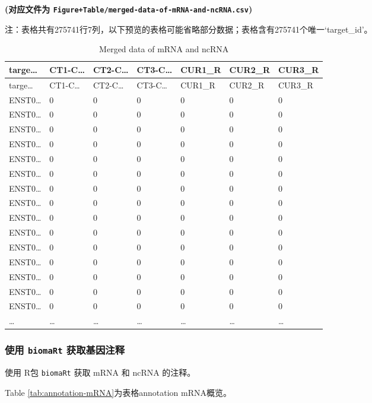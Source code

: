 \documentclass[
]{article}
\begin{document}
\textbf{(对应文件为 \texttt{Figure+Table/merged-data-of-mRNA-and-ncRNA.csv})}

\begin{center}\begin{tcolorbox}[colback=gray!10, colframe=gray!50, width=0.9\linewidth, arc=1mm, boxrule=0.5pt]注：表格共有275741行7列，以下预览的表格可能省略部分数据；表格含有275741个唯一`target\_id'。
\end{tcolorbox}
\end{center}

\begin{longtable}[]{@{}lllllll@{}}
\caption{\label{tab:merged-data-of-mRNA-and-ncRNA}Merged data of mRNA and ncRNA}\tabularnewline
\toprule
targe\ldots{} & CT1-C\ldots{} & CT2-C\ldots{} & CT3-C\ldots{} & CUR1\_R & CUR2\_R & CUR3\_R\tabularnewline
\midrule
\endfirsthead
\toprule
targe\ldots{} & CT1-C\ldots{} & CT2-C\ldots{} & CT3-C\ldots{} & CUR1\_R & CUR2\_R & CUR3\_R\tabularnewline
\midrule
\endhead
ENST0\ldots{} & 0 & 0 & 0 & 0 & 0 & 0\tabularnewline
ENST0\ldots{} & 0 & 0 & 0 & 0 & 0 & 0\tabularnewline
ENST0\ldots{} & 0 & 0 & 0 & 0 & 0 & 0\tabularnewline
ENST0\ldots{} & 0 & 0 & 0 & 0 & 0 & 0\tabularnewline
ENST0\ldots{} & 0 & 0 & 0 & 0 & 0 & 0\tabularnewline
ENST0\ldots{} & 0 & 0 & 0 & 0 & 0 & 0\tabularnewline
ENST0\ldots{} & 0 & 0 & 0 & 0 & 0 & 0\tabularnewline
ENST0\ldots{} & 0 & 0 & 0 & 0 & 0 & 0\tabularnewline
ENST0\ldots{} & 0 & 0 & 0 & 0 & 0 & 0\tabularnewline
ENST0\ldots{} & 0 & 0 & 0 & 0 & 0 & 0\tabularnewline
ENST0\ldots{} & 0 & 0 & 0 & 0 & 0 & 0\tabularnewline
ENST0\ldots{} & 0 & 0 & 0 & 0 & 0 & 0\tabularnewline
ENST0\ldots{} & 0 & 0 & 0 & 0 & 0 & 0\tabularnewline
ENST0\ldots{} & 0 & 0 & 0 & 0 & 0 & 0\tabularnewline
ENST0\ldots{} & 0 & 0 & 0 & 0 & 0 & 0\tabularnewline
\ldots{} & \ldots{} & \ldots{} & \ldots{} & \ldots{} & \ldots{} & \ldots{}\tabularnewline
\bottomrule
\end{longtable}

\hypertarget{ux4f7fux7528-biomart-ux83b7ux53d6ux57faux56e0ux6ce8ux91ca}{%
\subsubsection{\texorpdfstring{使用 \texttt{biomaRt} 获取基因注释}{使用 biomaRt 获取基因注释}}\label{ux4f7fux7528-biomart-ux83b7ux53d6ux57faux56e0ux6ce8ux91ca}}

使用 R包 \texttt{biomaRt} 获取 mRNA 和 ncRNA 的注释。

Table \ref{tab:annotation-mRNA}为表格annotation mRNA概览。
\end{document}
